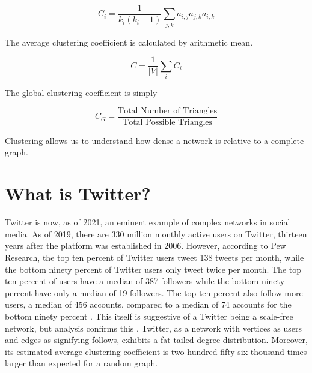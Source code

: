 $$
C_i =\frac{1}{k_i(k_i-1)} \sum_{j,k} a_{i,j}a_{j,k}a_{i,k}
$$

\noindent The average clustering coefficient is calculated by arithmetic mean.

$$
{\bar C} = \frac{1}{|V|}\sum_{i} C_i
$$

\noindent The global clustering coefficient is simply

$$
C_{G} = \frac{\text{Total Number of Triangles}}{\text{Total Possible Triangles}}
$$

\noindent Clustering allows us to understand how dense a network is relative to a complete graph. 

\section{What is Twitter?}
\label{section:Twitter}
Twitter is now, as of 2021, an eminent example of complex networks in social media.
As of 2019, there are 330 million monthly active users on Twitter, thirteen years after the platform was
established in 2006. However, according to Pew Research, the top ten percent of Twitter users tweet 138 
tweets per month, while the bottom ninety percent of Twitter users only tweet twice per month. The top ten percent of users
have a median of 387 followers while the bottom ninety percent have only a median of 19 followers. The top ten percent
also follow more users, a median of 456 accounts, compared to a median of 74 accounts for the bottom ninety percent \cite{wojcik2019sizing}.
This itself is suggestive of a Twitter being a scale-free network, but analysis confirms this \cite{Aparicio}. Twitter, as a network
with vertices as users and edges as signifying follows, exhibits a fat-tailed degree distribution. Moreover, its estimated
average clustering coefficient is two-hundred-fifty-six-thousand times larger than expected for a random graph.


